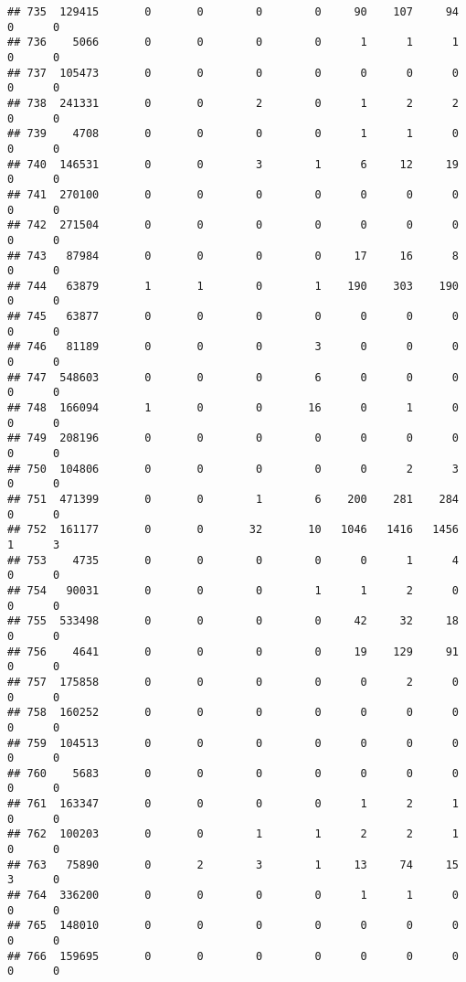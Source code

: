 \documentclass[
]{article}
\begin{document}
\begin{verbatim}
## 735  129415       0       0        0        0     90    107     94     0      0
## 736    5066       0       0        0        0      1      1      1     0      0
## 737  105473       0       0        0        0      0      0      0     0      0
## 738  241331       0       0        2        0      1      2      2     0      0
## 739    4708       0       0        0        0      1      1      0     0      0
## 740  146531       0       0        3        1      6     12     19     0      0
## 741  270100       0       0        0        0      0      0      0     0      0
## 742  271504       0       0        0        0      0      0      0     0      0
## 743   87984       0       0        0        0     17     16      8     0      0
## 744   63879       1       1        0        1    190    303    190     0      0
## 745   63877       0       0        0        0      0      0      0     0      0
## 746   81189       0       0        0        3      0      0      0     0      0
## 747  548603       0       0        0        6      0      0      0     0      0
## 748  166094       1       0        0       16      0      1      0     0      0
## 749  208196       0       0        0        0      0      0      0     0      0
## 750  104806       0       0        0        0      0      2      3     0      0
## 751  471399       0       0        1        6    200    281    284     0      0
## 752  161177       0       0       32       10   1046   1416   1456     1      3
## 753    4735       0       0        0        0      0      1      4     0      0
## 754   90031       0       0        0        1      1      2      0     0      0
## 755  533498       0       0        0        0     42     32     18     0      0
## 756    4641       0       0        0        0     19    129     91     0      0
## 757  175858       0       0        0        0      0      2      0     0      0
## 758  160252       0       0        0        0      0      0      0     0      0
## 759  104513       0       0        0        0      0      0      0     0      0
## 760    5683       0       0        0        0      0      0      0     0      0
## 761  163347       0       0        0        0      1      2      1     0      0
## 762  100203       0       0        1        1      2      2      1     0      0
## 763   75890       0       2        3        1     13     74     15     3      0
## 764  336200       0       0        0        0      1      1      0     0      0
## 765  148010       0       0        0        0      0      0      0     0      0
## 766  159695       0       0        0        0      0      0      0     0      0

\end{verbatim}
\end{document}
